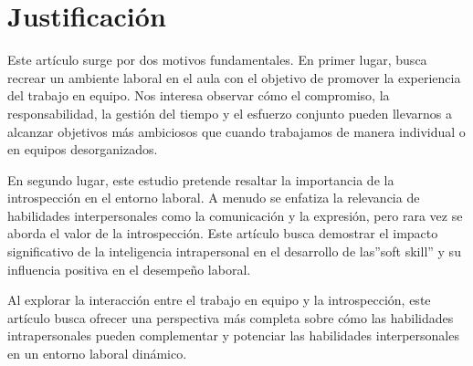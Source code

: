 \documentclass{article}
\begin{document}
\section{Justificación}
Este artículo surge por dos motivos fundamentales. En primer lugar, busca recrear un ambiente laboral en el aula con el objetivo de promover la experiencia del trabajo en equipo. Nos interesa observar cómo el compromiso, la responsabilidad, la gestión del tiempo y el esfuerzo conjunto pueden llevarnos a alcanzar objetivos más ambiciosos que cuando trabajamos de manera individual o en equipos desorganizados.

En segundo lugar, este estudio pretende resaltar la importancia de la introspección en el entorno laboral. A menudo se enfatiza la relevancia de habilidades interpersonales como la comunicación y la expresión, pero rara vez se aborda el valor de la introspección. Este artículo busca demostrar el impacto significativo de la inteligencia intrapersonal en el desarrollo de las''soft skill'' y su influencia positiva en el desempeño laboral.

Al explorar la interacción entre el trabajo en equipo y la introspección, este artículo busca ofrecer una perspectiva más completa sobre cómo las habilidades intrapersonales pueden complementar y potenciar las habilidades interpersonales en un entorno laboral dinámico.
\end{document}

